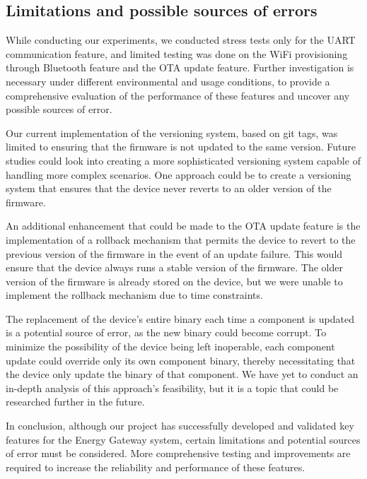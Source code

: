 \subsection{Limitations and possible sources of errors}
\label{sec:limitations}

While conducting our experiments, we conducted stress tests only for the UART communication feature, and limited testing was done on the WiFi provisioning through Bluetooth feature and the OTA update feature. Further investigation is necessary under different environmental and usage conditions, to provide a comprehensive evaluation of the performance of these features and uncover any possible sources of error.

Our current implementation of the versioning system, based on git tags, was limited to ensuring that the firmware is not updated to the same version. Future studies could look into creating a more sophisticated versioning system capable of handling more complex scenarios. One approach could be to create a versioning system that ensures that the device never reverts to an older version of the firmware.

An additional enhancement that could be made to the OTA update feature is the implementation of a rollback mechanism that permits the device to revert to the previous version of the firmware in the event of an update failure. This would ensure that the device always runs a stable version of the firmware. The older version of the firmware is already stored on the device, but we were unable to implement the rollback mechanism due to time constraints.

The replacement of the device's entire binary each time a component is updated is a potential source of error, as the new binary could become corrupt. To minimize the possibility of the device being left inoperable, each component update could override only its own component binary, thereby necessitating that the device only update the binary of that component. We have yet to conduct an in-depth analysis of this approach's feasibility, but it is a topic that could be researched further in the future.

In conclusion, although our project has successfully developed and validated key features for the Energy Gateway system, certain limitations and potential sources of error must be considered. More comprehensive testing and improvements are required to increase the reliability and performance of these features.